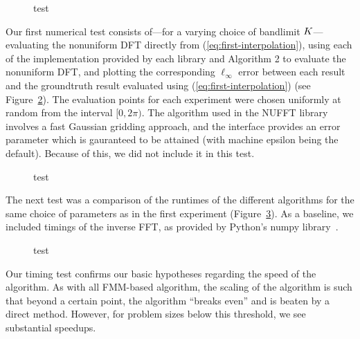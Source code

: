 \begin{figure}[h]
  \centering
  
  \caption{test}\label{fig:testfunc}
\end{figure}

Our first numerical test consists of---for a varying choice of
bandlimit $K$---evaluating the nonuniform DFT directly from
(\ref{eq:first-interpolation}), using each of the implementation
provided by each library and Algorithm 2 to evaluate the nonuniform
DFT, and plotting the corresponding $\ell_\infty$ error between each
result and the groundtruth result evaluated using
(\ref{eq:first-interpolation}) (see Figure~\ref{fig:linf-error}). The
evaluation points for each experiment were chosen uniformly at random
from the interval $[0, 2\pi)$. The algorithm used in the NUFFT library
involves a fast Gaussian gridding approach, and the interface provides
an error parameter which is gauranteed to be attained (with machine
epsilon being the default). Because of this, we did not include it in
this test.

\begin{figure}[h]
  \centering
  
  \caption{test}\label{fig:linf-error}
\end{figure}

The next test was a comparison of the runtimes of the different
algorithms for the same choice of parameters as in the first
experiment (Figure~\ref{fig:timings}). As a baseline, we included
timings of the inverse FFT, as provided by Python's numpy
library~\cite{van2011numpy}.

\begin{figure}[h]
  \centering
  
  \caption{test}\label{fig:timings}
\end{figure}

Our timing test confirms our basic hypotheses regarding the speed of
the algorithm. As with all FMM-based algorithm, the scaling of the
algorithm is such that beyond a certain point, the algorithm ``breaks
even'' and is beaten by a direct method. However, for problem sizes
below this threshold, we see substantial speedups.

